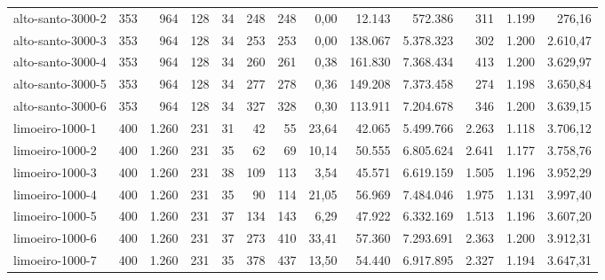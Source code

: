 \begin{table}[ht!]
{\begin{tabular}{lrrrrrrrrrrrr}
			\rowcolor{rowgrey}alto-santo-3000-2                                                       & 353   & 964   & 128 & 34 & 248 & 248 & 0,00  & 12.143  & 572.386    & 311   & 1.199 & 276,16   \\
			\rowcolor{rowgrey}alto-santo-3000-3                                                       & 353   & 964   & 128 & 34 & 253 & 253 & 0,00  & 138.067 & 5.378.323  & 302   & 1.200 & 2.610,47 \\
			\rowcolor{rowlight}alto-santo-3000-4                                                      & 353   & 964   & 128 & 34 & 260 & 261 & 0,38  & 161.830 & 7.368.434  & 413   & 1.200 & 3.629,97 \\
			\rowcolor{rowlight}alto-santo-3000-5                                                      & 353   & 964   & 128 & 34 & 277 & 278 & 0,36  & 149.208 & 7.373.458  & 274   & 1.198 & 3.650,84 \\
			\rowcolor{rowlight}alto-santo-3000-6                                                      & 353   & 964   & 128 & 34 & 327 & 328 & 0,30  & 113.911 & 7.204.678  & 346   & 1.200 & 3.639,15 \\ \midrule
			\rowcolor{rowlight}limoeiro-1000-1                                                        & 400   & 1.260 & 231 & 31 & 42  & 55  & 23,64 & 42.065  & 5.499.766  & 2.263 & 1.118 & 3.706,12 \\
			\rowcolor{rowlight}limoeiro-1000-2                                                        & 400   & 1.260 & 231 & 35 & 62  & 69  & 10,14 & 50.555  & 6.805.624  & 2.641 & 1.177 & 3.758,76 \\
			\rowcolor{rowlight}limoeiro-1000-3                                                        & 400   & 1.260 & 231 & 38 & 109 & 113 & 3,54  & 45.571  & 6.619.159  & 1.505 & 1.196 & 3.952,29 \\
			\rowcolor{rowlight}limoeiro-1000-4                                                        & 400   & 1.260 & 231 & 35 & 90  & 114 & 21,05 & 56.969  & 7.484.046  & 1.975 & 1.131 & 3.997,40 \\
			\rowcolor{rowlight}limoeiro-1000-5                                                        & 400   & 1.260 & 231 & 37 & 134 & 143 & 6,29  & 47.922  & 6.332.169  & 1.513 & 1.196 & 3.607,20 \\
			\rowcolor{rowlight}limoeiro-1000-6                                                        & 400   & 1.260 & 231 & 37 & 273 & 410 & 33,41 & 57.360  & 7.293.691  & 2.363 & 1.200 & 3.912,31 \\
			\rowcolor{rowlight}limoeiro-1000-7                                                        & 400   & 1.260 & 231 & 35 & 378 & 437 & 13,50 & 54.440  & 6.917.895  & 2.327 & 1.194 & 3.647,31 \\

\end{tabular}}
\end{table}
